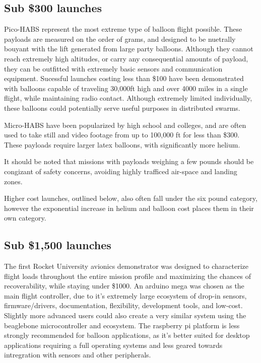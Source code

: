\documentclass[heading.tex]{subfiles}
\begin{document}
\subsection{Sub \$300 launches}

Pico-HABS represent the most extreme type of balloon flight possible.
These payloads are measured on the order of grams, and designed to be nuetrally
bouyant with the lift generated from large party balloons. Although they cannot
reach extremely high altitudes, or carry any consequential amounts of payload,
they can be outfitted with extremely basic sensors and communication equipment.
Sucessful launches costing less than \$100 have been demonstrated with balloons
capable of traveling 30,000ft high and over 4000 miles in a single flight,
while maintaining radio contact.
\cite{Leo} \cite{Amsat}
Although extremely limited individually,
these balloons could potentially serve useful purposes in distributed swarms.

Micro-HABS have been popularized by high school and colleges, and are often used
to take still and video footage from up to 100,000 ft for less
than \$300. These payloads require larger latex balloons, with significantly
more helium. 

It should be noted that missions with payloads weighing a few pounds
should be congizant of safety concerns,
avoiding highly trafficed air-space and landing zones.

Higher cost launches, outlined below, also often fall under the six pound
category, however the exponential increase in helium and balloon cost places
them in their own category.

\subsection{Sub \$1,500 launches}

The first Rocket University avionics demonstrator was designed to characterize
flight loads throughout the entire mission profile and maximizing the chances
of recoverability, while staying under \$1000. An arduino mega was chosen as
the main flight controller, due to it's extremely large ecosystem of drop-in
sensors, firmware/drivers, documentation, flexibility, development tools,
and low-cost. Slightly more advanced users could also create a very similar
system using the beaglebone microcontroller and ecosystem. The raspberry pi
platform is less strongly recommended for balloon applications, as it's better
suited for desktop applications requiring a full operating systems and less
geared towards intregration with sensors and other peripherals.
\end{document}
